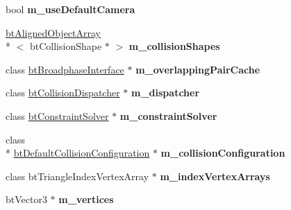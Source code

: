 \begin{DoxyCompactItemize}
\item 
\hypertarget{class_fork_lift_demo_a1e93959a5459c00383e7e6eaa8776eb1}{bool {\bfseries m\+\_\+use\+Default\+Camera}}\label{class_fork_lift_demo_a1e93959a5459c00383e7e6eaa8776eb1}

\item 
\hypertarget{class_fork_lift_demo_ac89fb83411c9f2f0f0c22c8dcb8e7205}{\hyperlink{classbt_aligned_object_array}{bt\+Aligned\+Object\+Array}\\*
$<$ bt\+Collision\+Shape $\ast$ $>$ {\bfseries m\+\_\+collision\+Shapes}}\label{class_fork_lift_demo_ac89fb83411c9f2f0f0c22c8dcb8e7205}

\item 
\hypertarget{class_fork_lift_demo_ab57aa2ca9156da359167435a0fd07a70}{class \hyperlink{classbt_broadphase_interface}{bt\+Broadphase\+Interface} $\ast$ {\bfseries m\+\_\+overlapping\+Pair\+Cache}}\label{class_fork_lift_demo_ab57aa2ca9156da359167435a0fd07a70}

\item 
\hypertarget{class_fork_lift_demo_ae57a4f33a8837f146c8ee73261c4f740}{class \hyperlink{classbt_collision_dispatcher}{bt\+Collision\+Dispatcher} $\ast$ {\bfseries m\+\_\+dispatcher}}\label{class_fork_lift_demo_ae57a4f33a8837f146c8ee73261c4f740}

\item 
\hypertarget{class_fork_lift_demo_ab654c8ffdf298aad0a039dba4de9c349}{class \hyperlink{classbt_constraint_solver}{bt\+Constraint\+Solver} $\ast$ {\bfseries m\+\_\+constraint\+Solver}}\label{class_fork_lift_demo_ab654c8ffdf298aad0a039dba4de9c349}

\item 
\hypertarget{class_fork_lift_demo_a16cbabad397046f1f90b222f2f6db7d5}{class \\*
\hyperlink{classbt_default_collision_configuration}{bt\+Default\+Collision\+Configuration} $\ast$ {\bfseries m\+\_\+collision\+Configuration}}\label{class_fork_lift_demo_a16cbabad397046f1f90b222f2f6db7d5}

\item 
\hypertarget{class_fork_lift_demo_a19257ff4831d88600a7cebe6f8b87d2c}{class bt\+Triangle\+Index\+Vertex\+Array $\ast$ {\bfseries m\+\_\+index\+Vertex\+Arrays}}\label{class_fork_lift_demo_a19257ff4831d88600a7cebe6f8b87d2c}

\item 
\hypertarget{class_fork_lift_demo_a4eb6482481a5276716c4477440d052f2}{bt\+Vector3 $\ast$ {\bfseries m\+\_\+vertices}}\label{class_fork_lift_demo_a4eb6482481a5276716c4477440d052f2}


\end{DoxyCompactItemize}
